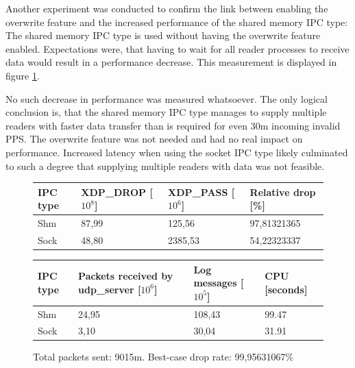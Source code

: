 Another experiment was conducted to confirm the link between enabling the overwrite feature and the increased performance of the shared memory \ac{IPC} type:
The shared memory \ac{IPC} type is used without having the overwrite feature enabled.
Expectations were, that having to wait for all reader processes to receive data would result in a performance decrease.
This measurement is displayed in figure \ref{fig:data:ipv4v6:30m:131068:2nd:NoOverwrite}.

No such decrease in performance was measured whatsoever.
The only logical conclusion is, that the shared memory \ac{IPC} type manages to supply multiple readers with faster data transfer than is required for even 30m incoming invalid \ac{PPS}.
The overwrite feature was not needed and had no real impact on performance.
Increased latency when using the socket \ac{IPC} type likely culminated to such a degree that supplying multiple readers with data was not feasible.

\begin{figure}[!h]
	\centering
	\scriptsize
	\begin{tabular}{llll}
		\toprule
		\textbf{IPC type} & \textbf{XDP\_DROP [$10^8$]} & \textbf{XDP\_PASS [$10^6$]} & \textbf{Relative drop [\%]} \\ \midrule 
		Shm & 87,99 & 125,56 & 97,81321365 \\
        Sock & 48,80 & 2385,53 & 54,22323337 \\
	\bottomrule
	\end{tabular}
    \begin{tabular}{llll}
		\toprule
		\textbf{IPC type} & \textbf{Packets received by udp\_server [$10^6$]} & \textbf{Log messages [$10^5$]} & \textbf{CPU [seconds]} \\ \midrule 
		Shm & 24,95 & 108,43 & 99.47 \\
        Sock & 3,10 & 30,04 & 31.91 \\
	\bottomrule
	\end{tabular}
	\caption[Simplefail2ban with 2nd Reader, IPv4v6, 30m \ac{PPS}, 131068 malicious clients]{Total packets sent: 9015m. Best-case drop rate: 99,95631067\%}
	\label{fig:data:ipv4v6:30m:131068:2nd:NoOverwrite}
\end{figure}